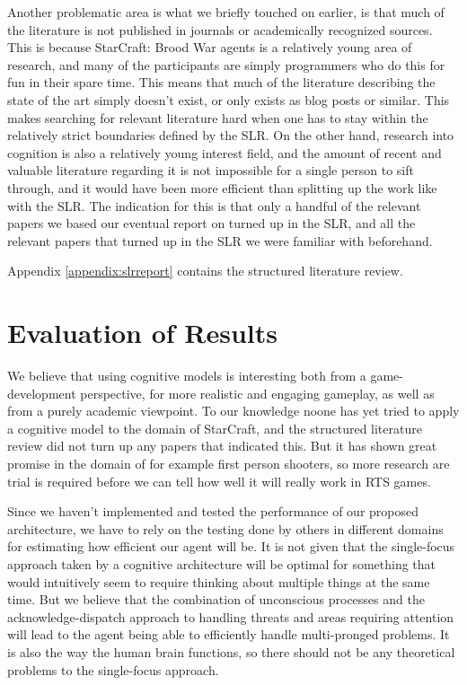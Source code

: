 Another problematic area is what we briefly touched on earlier, is that much of
the literature is not published in journals or academically recognized sources.
This is because StarCraft: Brood War agents is a relatively young area of
research, and many of the participants are simply programmers who do this for
fun in their spare time. This means that much of the literature describing the
state of the art simply doesn't exist, or only exists as blog posts or similar.
This makes searching for relevant literature hard when one has to stay within
the relatively strict boundaries defined by the SLR. On the other hand,
research into cognition is also a relatively young interest field, and the
amount of recent and valuable literature regarding it is not impossible for a
single person to sift through, and it would have been more efficient than
splitting up the work like with the SLR. The indication for this is that only a
handful of the relevant papers we based our eventual report on turned up in the
SLR, and all the relevant papers that turned up in the SLR we were familiar
with beforehand.

Appendix \ref{appendix:slrreport} contains the structured literature review.


\section{Evaluation of Results}
We believe that using cognitive models is interesting both from a
game-development perspective, for more realistic and engaging gameplay, as well
as from a purely academic viewpoint. To our knowledge noone has yet tried
to apply a cognitive model to the domain of StarCraft, and the structured
literature review did not turn up any papers that indicated this. But it has
shown great promise in the domain of for example first person shooters, so more
research are trial is required before we can tell how well it will really work
in RTS games.

Since we haven't implemented and tested the performance of our proposed
architecture, we have to rely on the testing done by others in different domains
for estimating how efficient our agent will be. It is not given that the
single-focus approach taken by a cognitive architecture will be optimal for
something that would intuitively seem to require thinking about multiple things
at the same time. But we believe that the combination of unconscious processes
and the acknowledge-dispatch approach to handling threats and areas requiring
attention will lead to the agent being able to efficiently handle multi-pronged
problems. It is also the way the human brain functions, so there should not be
any theoretical problems to the single-focus approach.


